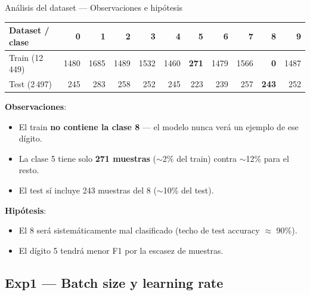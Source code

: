 \documentclass[aspectratio=169,10pt]{beamer}
\begin{document}
\begin{frame}{Análisis del dataset — Observaciones e hipótesis}
  \begin{table}
    \centering
    \scriptsize
    \begin{tabular}{lrrrrrrrrrr}
      \toprule
      Dataset / clase & 0 & 1 & 2 & 3 & 4 & 5 & 6 & 7 & 8 & 9 \\
      \midrule
      Train (12\,449)    & 1480 & 1685 & 1489 & 1532 & 1460 & \textbf{271} & 1479 & 1566 & \textbf{0} & 1487 \\
      Test (2\,497)  & 245 & 283 & 258 & 252 & 245 & 223 & 239 & 257 & \textbf{243} & 252 \\
      \bottomrule
    \end{tabular}
  \end{table}
  \vspace{0.3em}
  \textbf{Observaciones}:
  \begin{itemize}
    \item El train \textbf{no contiene la clase 8} — el modelo nunca
      verá un ejemplo de ese dígito.
    \item La clase 5 tiene solo \textbf{271 muestras} ($\sim$2\% del train)
      contra $\sim$12\% para el resto.
    \item El test sí incluye 243 muestras del 8 ($\sim$10\% del test).
  \end{itemize}
  \vspace{0.3em}
  \textbf{Hipótesis}:
  \begin{itemize}
    \item El 8 será sistemáticamente mal clasificado
      (techo de test accuracy $\approx$ 90\%).
    \item El dígito 5 tendrá menor F1 por la escasez de muestras.

  \end{itemize}
\end{frame}

\subsection{Exp1 — Batch size y learning rate}
\end{document}
